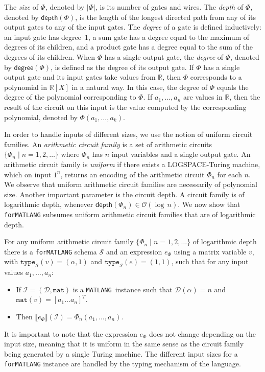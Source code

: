 \documentclass[sigconf]{acmart}
\newcommand{\RR}{\mathbb{R}}
\newcommand{\sem}[2]{\llbracket #1 \rrbracket(#2)}
\newcommand{\I}{\mathcal{I}}
\newcommand{\Sch}{\mathcal{S}}
\newcommand{\dom}{\mathcal{D}}
\newcommand{\conc}{\texttt{mat}}
\newcommand{\ttype}{\texttt{type}_{\Sch}}
\newcommand{\lang}{\texttt{MATLANG}\xspace}
\newcommand{\langfor}{\texttt{for}\text{-}\texttt{MATLANG}\xspace}
\newcommand{\logspace}{{\sc LOGSPACE}}
\begin{document}
The \textit{size} of $\Phi$, denoted by $|\Phi|$, is its number of gates and wires. The \textit{depth} of $\Phi$, denoted
by $\mathsf{depth}(\Phi)$, is the length of the longest directed path from any of its output gates to any of the input gates. The \textit{degree} of a gate is defined inductively: an input gate has degree~1, a sum gate has a degree equal to the maximum of degrees of its children, and a product gate has a degree equal to the sum of the degrees of its children. When $\Phi$ has a single output gate, the \textit{degree} of $\Phi$, denoted by $\mathsf{degree}(\Phi)$, is defined as the degree of its output gate. If $\Phi$ has a single output gate and its input gates take values from $\RR$, then $\Phi$ corresponds to a polynomial in $\RR[X]$ in a natural way. In this case, the {degree} of $\Phi$ equals the degree of the polynomial corresponding to $\Phi$.
If $a_1,\ldots ,a_n$ are values in $\RR$, then 
the result of the circuit on this input is the value computed by the corresponding polynomial, denoted by $\Phi(a_1,\ldots ,a_k)$.

In order to handle inputs of different sizes, we use the notion of uniform circuit families. An \textit{arithmetic circuit family} is a set of arithmetic circuits $\{\Phi_n\mid n=1,2,\ldots\}$ where $\Phi_n$ has $n$ input variables and a single output gate. An arithmetic circuit family is \textit{uniform} if there exists a \logspace-Turing machine,
which on input $1^n$, returns an encoding of the arithmetic circuit $\Phi_n$ for each $n$.
We observe that uniform arithmetic circuit families are necessarily of polynomial size. 
Another important parameter is the circuit depth. A circuit family is of logarithmic depth, whenever $\mathsf{depth}(\Phi_n)\in \mathcal{O}(\log\, n)$. We  now show that \langfor subsumes uniform arithmetic circuit families that are of logarithmic depth. 

\begin{theorem}
\label{th-circuits-ml}
For any uniform arithmetic circuit family $\{\Phi_n\mid n=1,2,\ldots\}$ of logarithmic depth there is a \langfor schema $\Sch$ and an expression $e_\Phi$ using a matrix variable $v$, with $\ttype(v)=(\alpha,1)$ and $\ttype(e) = (1,1)$, such that for any input values $a_1,\ldots ,a_n$: 
\begin{itemize}
\item If $\I = (\dom,\conc)$ is a \lang\ instance such that $\dom(\alpha) = n$ and $\conc(v) = [a_1 \ldots a_n]^T$.
\item Then $\sem{e_\Phi}{\I} = \Phi_n(a_1,\ldots ,a_n)$.
\end{itemize}
\end{theorem}
It is important to note that the expression $e_\Phi$ does not change depending on the input size, meaning that it is uniform in the same sense as the circuit family being generated by a single Turing machine. The different input sizes for a \langfor instance are handled by the typing mechanism of the language. 
\end{document}
